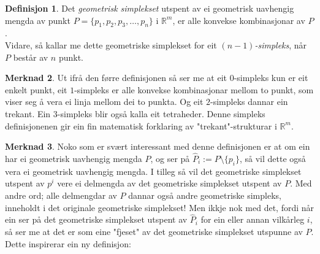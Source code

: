 \documentclass[a4paper, titlepage, 12pt, norsk]{article}
\theoremstyle{plain}
\newtheorem{theorem}{Teorem}[section]
\theoremstyle{definition}
\newtheorem{definition}[theorem]{Definisjon}
\newtheorem{remark}[theorem]{Merknad}
\newcommand{\Rb}{\mathbb{R}}
\begin{document}
\begin{definition}
	Det \emph{geometrisk simplekset} utspent av ei geometrisk uavhengig mengda av punkt $P=\{p_1, p_2, p_3, \dots, p_n\}$ i $\Rb^m$, er alle konvekse kombinasjonar av $P$.
	\\Vidare, så kallar me dette geometriske simplekset for eit \emph{$(n-1)$-simpleks}, når $P$ består av $n$ punkt.
\end{definition}
\begin{remark}
	Ut ifrå den førre definisjonen så ser me at eit $0$-simpleks kun er eit enkelt punkt, eit $1$-simpleks er alle konvekse kombinasjonar mellom to punkt, som viser seg å vera ei linja mellom dei to punkta. Og eit $2$-simpleks dannar ein trekant. Ein $3$-simpleks blir også kalla eit tetraheder. Denne simpleks definisjonenen gir ein fin matematisk forklaring av "trekant"-strukturar i $\Rb^m$.
\end{remark}
\begin{remark}
	Noko som er svært interessant med denne definisjonen er at om ein har ei geometrisk uavhengig mengda $P$, og ser på $\hat{P}_i := P \setminus \{p_i\}$, så vil dette også vera ei geometrisk uavhengig mengda. I tilleg så vil det geometriske simplekset utspent av $p^i$ vere ei delmengda av det geometriske simplekset utspent av $P$. Med andre ord; alle delmengdar av $P$ dannar også andre geometriske simpleks, inneholdt i det originale geometriske simplekset! Men ikkje nok med det, fordi når ein ser på det geometriske simplekset utspent av $\hat{P}_i$ for ein eller annan vilkårleg $i$, så ser me at det er som eine "fjeset" av det geometriske simplekset utspunne av $P$. Dette inspirerar ein ny definisjon:
\end{remark}
\end{document}
